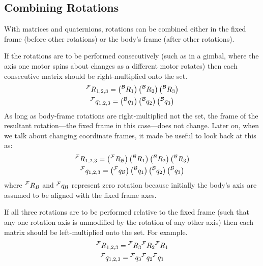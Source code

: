 \documentclass[letterpaper,10pt]{article}
\newcommand\leftidx[3]{%
  {\vphantom{#2}}#1#2#3%
}
\begin{document}
\subsection{Combining Rotations}
With matrices and quaternions, rotations can be combined either in the fixed frame (before other rotations) or the body's frame (after other rotations).

If the rotations are to be performed consecutively (such as in a gimbal, where the axis one motor spins about changes as a different motor rotates) then each consecutive matrix should be right-multiplied onto the set.
\begin{gather}
\leftidx{^\mathcal{F}}{R}{_{1,2,3}} = \left(\leftidx{^\mathcal{B}}{R}{_1}\right) \left(\leftidx{^\mathcal{B}}{R}{_2}\right) \left(\leftidx{^\mathcal{B}}{R}{_3}\right) \\
\leftidx{^\mathcal{F}}{q}{_{1,2,3}} = \left(\leftidx{^\mathcal{B}}{q}{_1}\right) \left(\leftidx{^\mathcal{B}}{q}{_2}\right) \left(\leftidx{^\mathcal{B}}{q}{_3} \right)
\end{gather}
 As long as body-frame rotations are right-multiplied not the set, the frame of the resultant rotation---the fixed frame in this case---does not change. Later on, when we talk about changing coordinate frames, it made be useful to look back at this as:
\begin{gather}
\leftidx{^\mathcal{F}}{R}{_{1,2,3}} = \left(\leftidx{^\mathcal{F}}{R}{_\mathcal{B}}\right) \left(\leftidx{^\mathcal{B}}{R}{_1}\right) \left(\leftidx{^\mathcal{B}}{R}{_2}\right) \left(\leftidx{^\mathcal{B}}{R}{_3}\right) \\
\leftidx{^\mathcal{F}}{q}{_{1,2,3}} = \left(\leftidx{^\mathcal{F}}{q}{_\mathcal{B}}\right) \left(\leftidx{^\mathcal{B}}{q}{_1}\right) \left(\leftidx{^\mathcal{B}}{q}{_2}\right) \left(\leftidx{^\mathcal{B}}{q}{_3}\right)
\end{gather}
where $\leftidx{^\mathcal{F}}{R}{_\mathcal{B}}$ and $\leftidx{^\mathcal{F}}{q}{_\mathcal{B}}$ represent zero rotation because initially the body's axis are assumed to be aligned with the fixed frame axes.

If all three rotations are to be performed relative to the fixed frame (such that any one rotation axis is unmodified by the rotation of any other axis) then each matrix should be left-multiplied onto the set. For example.
\begin{gather}
\leftidx{^\mathcal{F}}{R}{_{1,2,3}} = \leftidx{^\mathcal{F}}{R}{_3} \leftidx{^\mathcal{F}}{R}{_2} \leftidx{^\mathcal{F}}{R}{_1} \\
\leftidx{^\mathcal{F}}{q}{_{1,2,3}} = \leftidx{^\mathcal{F}}{q}{_3} \leftidx{^\mathcal{F}}{q}{_2} \leftidx{^\mathcal{F}}{q}{_1}
\end{gather}
\end{document}

